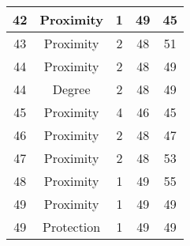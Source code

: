 \documentclass[results.tex]{subfiles}
\begin{document}
\begin{center}
\begin{tabular}{| c || c | c | c | c |}
            \hline
            42                      & Proximity                    & 1                      & 49                      & 45                   \\
            \hline
            43                      & Proximity                    & 2                      & 48                      & 51                   \\
            \hline
            44                      & Proximity                    & 2                      & 48                      & 49                   \\
            \hline
            44                      & Degree                       & 2                      & 48                      & 49                   \\
            \hline
            45                      & Proximity                    & 4                      & 46                      & 45                   \\
            \hline
            46                      & Proximity                    & 2                      & 48                      & 47                   \\
            \hline
            47                      & Proximity                    & 2                      & 48                      & 53                   \\
            \hline
            48                      & Proximity                    & 1                      & 49                      & 55                   \\
            \hline
            49                      & Proximity                    & 1                      & 49                      & 49                   \\
            \hline
            49                      & Protection                   & 1                      & 49                      & 49                   \\
            \hline
        \end{tabular}
    \end{center}
\end{document}
